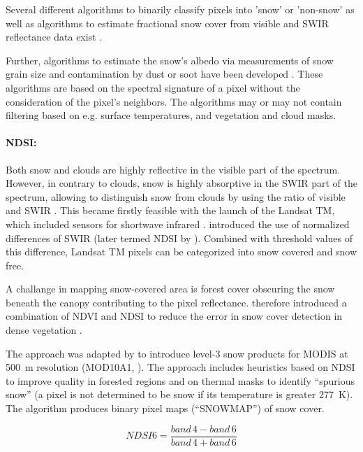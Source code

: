 \documentclass[a4paper,10pt]{article}
\begin{document}
Several different algorithms to binarily classify pixels into 'snow' or 'non-snow' as well as algorithms to estimate fractional snow cover from visible and \gls{SWIR} reflectance data exist \citep{Nolin2010}.

Further, algorithms to estimate the snow's albedo via measurements of snow grain size and contamination by dust or soot have been developed \citep{Nolin2010, Dozier2004}. These algorithms are based on the spectral signature of a pixel without the consideration of the pixel's neighbors. The algorithms may or may not contain filtering based on e.g. surface temperatures, and vegetation and cloud masks.

\paragraph{\gls{NDSI}:}
Both snow and clouds are highly reflective in the visible part of the spectrum. However, in contrary to clouds, snow is highly absorptive in the \gls{SWIR} part of the spectrum, allowing to distinguish snow from clouds by using the ratio of visible and \gls{SWIR} \citep{Hall2011}. This became firstly feasible with the launch of the Landsat \gls{TM}, which included sensors for shortwave infrared \citep{Lettenmaier2015}. \cite{Dozier1989} introduced the use of normalized differences of \gls{SWIR} (later termed \gls{NDSI} by \cite{Hall1995}). Combined with threshold values of this difference, Landsat TM pixels can be categorized into snow covered and snow free.

A challange in mapping snow-covered area is forest cover obscuring the snow beneath the canopy contributing to the pixel reflectance. \cite{Klein1998} therefore introduced a combination of \gls{NDVI} and \gls{NDSI} to reduce the error in snow cover detection in dense vegetation \cite{Nolin2010}.
 
The approach was adapted by \cite{Hall2002, Hall2001} to introduce level-3 snow products for \gls{MODIS} at \SI{500}{\meter} resolution (MOD10A1, \citep{Hall2016}). The approach includes heuristics based on \gls{NDSI} to improve quality in forested regions and on thermal masks to identify ``spurious snow'' (a pixel is not determined to be snow if its temperature is greater \SI{277}{\kelvin}). The algorithm produces binary pixel maps (``SNOWMAP'') of snow cover.


\begin{equation}
 NDSI6 = \frac{band \, 4 -band \, 6}{band \, 4 + band \, 6}
\end{equation}
\end{document}
